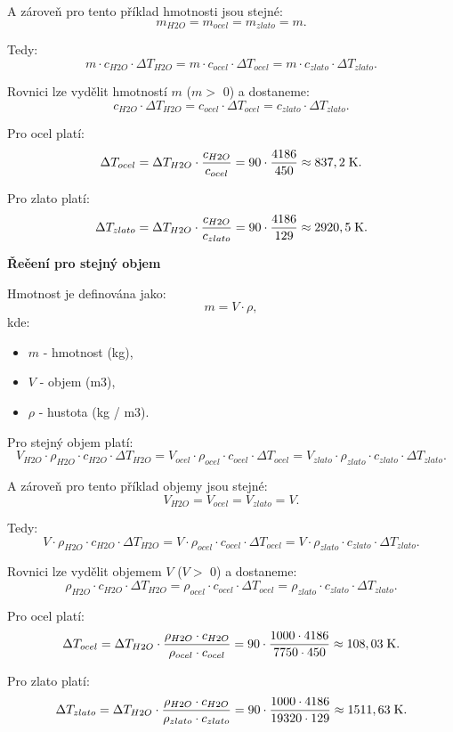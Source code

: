 \documentclass{article}
\begin{document}
A zároveň pro tento příklad hmotnosti jsou stejné:
$$
    m_{H2O} = m_{ocel} = m_{zlato} = m.
$$

Tedy:
$$
    m \cdot c_{H2O} \cdot \Delta T_{H2O} = m \cdot c_{ocel} \cdot \Delta T_{ocel} = m \cdot c_{zlato} \cdot \Delta T_{zlato}.
$$

Rovnici lze vydělit hmotností $m$ ($m >$ 0) a dostaneme:
$$
    c_{H2O} \cdot \Delta T_{H2O} = c_{ocel} \cdot \Delta T_{ocel} = c_{zlato} \cdot \Delta T_{zlato}.
$$

Pro ocel platí:
$$
    \Delta T_{ocel} = \Delta T_{H2O} \cdot \frac{c_{H2O}}{c_{ocel}} = 90 \cdot \frac{4 186}{450} \approx 837,2 \; \textrm{K}.
$$

Pro zlato platí:
$$
    \Delta T_{zlato} = \Delta T_{H2O} \cdot \frac{c_{H2O}}{c_{zlato}} = 90 \cdot \frac{4 186}{129} \approx 2 920,5 \; \textrm{K}.
$$

\textbf{Řeěení pro stejný objem}

Hmotnost je definována jako:
$$
    m = V \cdot \rho,
$$
kde:
\begin{itemize}
    \item $m$ - hmotnost (kg),
    \item $V$ - objem (m3),
    \item $\rho$ - hustota (kg / m3).
\end{itemize}

Pro stejný objem platí:
$$
    V_{H2O} \cdot \rho_{H2O} \cdot c_{H2O} \cdot \Delta T_{H2O} = V_{ocel} \cdot \rho_{ocel} \cdot c_{ocel} \cdot \Delta T_{ocel} = V_{zlato} \cdot \rho_{zlato} \cdot c_{zlato} \cdot \Delta T_{zlato}.
$$

A zároveň pro tento příklad objemy jsou stejné:
$$
    V_{H2O} = V_{ocel} = V_{zlato} = V.
$$

Tedy:
$$
    V \cdot \rho_{H2O} \cdot c_{H2O} \cdot \Delta T_{H2O} = V \cdot \rho_{ocel} \cdot c_{ocel} \cdot \Delta T_{ocel} = V \cdot \rho_{zlato} \cdot c_{zlato} \cdot \Delta T_{zlato}.
$$

Rovnici lze vydělit objemem $V$ ($V >$ 0) a dostaneme:
$$
    \rho_{H2O} \cdot c_{H2O} \cdot \Delta T_{H2O} = \rho_{ocel} \cdot c_{ocel} \cdot \Delta T_{ocel} = \rho_{zlato} \cdot c_{zlato} \cdot \Delta T_{zlato}.
$$

Pro ocel platí:
$$
    \Delta T_{ocel} = \Delta T_{H2O} \cdot \frac{\rho_{H2O} \cdot c_{H2O}}{\rho_{ocel} \cdot c_{ocel}} = 90 \cdot \frac{1 000 \cdot 4 186}{7 750 \cdot 450} \approx 108,03 \; \textrm{K}.
$$

Pro zlato platí:
$$
    \Delta T_{zlato} = \Delta T_{H2O} \cdot \frac{\rho_{H2O} \cdot c_{H2O}}{\rho_{zlato} \cdot c_{zlato}} = 90 \cdot \frac{1 000 \cdot 4 186}{19 320 \cdot 129} \approx 1511,63 \; \textrm{K}.
$$
\end{document}

